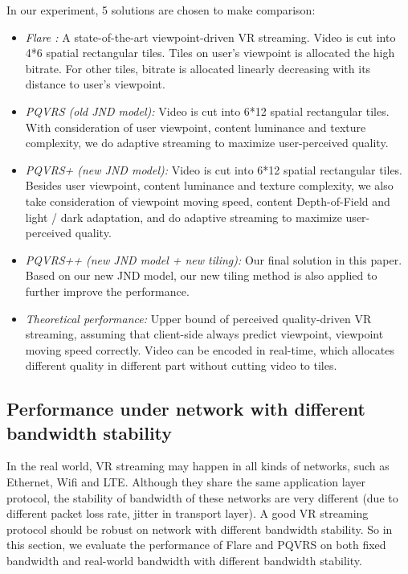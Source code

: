 In our experiment, 5 solutions are chosen to make comparison:

\begin{itemize}

\item \emph{Flare \cite{Flare}:} A state-of-the-art viewpoint-driven VR streaming. Video is cut into 4*6 spatial rectangular tiles. Tiles on user's viewpoint is allocated the high bitrate. For other tiles, bitrate is allocated linearly decreasing with its distance to user's viewpoint.

\item \emph{PQVRS (old JND model):} Video is cut into 6*12 spatial rectangular tiles. With consideration of user viewpoint, content luminance and texture complexity, we do adaptive streaming to maximize user-perceived quality.

\item \emph{PQVRS+ (new JND model):} Video is cut into 6*12 spatial rectangular tiles. Besides user viewpoint, content luminance and texture complexity, we also take consideration of viewpoint moving speed, content Depth-of-Field and light / dark adaptation, and do adaptive streaming to maximize user-perceived quality.

\item \emph{PQVRS++ (new JND model + new tiling):} Our final solution in this paper. Based on our new JND model, our new tiling method is also applied to further improve the performance.

\item \emph{Theoretical performance:} Upper bound of perceived quality-driven VR streaming, assuming that client-side always predict viewpoint, viewpoint moving speed correctly. Video can be encoded in real-time, which allocates different quality in different part without cutting video to tiles.

\end{itemize}

\subsection{Performance under network with different bandwidth stability}

In the real world, VR streaming may happen in all kinds of networks, such as Ethernet, Wifi and LTE. Although they share the same application layer protocol, the stability of bandwidth of these networks are very different (due to different packet loss rate, jitter in transport layer). A good VR streaming protocol should be robust on network with different bandwidth stability. So in this section, we evaluate the performance of Flare and PQVRS on both fixed bandwidth and real-world bandwidth with different bandwidth stability.

